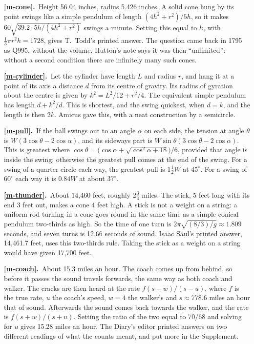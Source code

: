 \documentclass[11pt,a4paper]{article}
\newcommand{\ans}[2]{\par\smallskip\noindent\textbf{\ref{#1}.}\ #2}
\begin{document}
\ans{m-cone}{Height 56.04 inches, radius 5.426 inches. A solid cone hung by its point
swings like a simple pendulum of length $(4h^2 + r^2)/5h$, so it makes
$60\sqrt{39.2\cdot5h/(4h^2+r^2)}$ swings a minute. Setting this equal to $h$, with
$\tfrac13\pi r^2h = 1728$, gives T.~Todd's printed answer. The question came back in
1795 as Q995, without the volume. Hutton's note says it was then ``unlimited'': without
a second condition there are infinitely many such cones.}

\ans{m-cylinder}{Let the cylinder have length $L$ and radius $r$, and hang it at a point
of its axis a distance $d$ from its centre of gravity. Its radius of gyration about the
centre is given by $k^2 = L^2/12 + r^2/4$. The equivalent simple pendulum has length
$d + k^2/d$. This is shortest, and the swing quickest, when $d = k$, and the length is
then $2k$. Amicus gave this, with a neat construction by a semicircle.}

\ans{m-pull}{If the ball swings out to an angle $\alpha$ on each side, the tension at angle
$\theta$ is $W(3\cos\theta - 2\cos\alpha)$, and its sideways part is
$W\sin\theta(3\cos\theta - 2\cos\alpha)$. This is greatest where
$\cos\theta = \bigl(\cos\alpha + \sqrt{\cos^2\alpha + 18}\bigr)/6$, provided that angle is
inside the swing; otherwise the greatest pull comes at the end of the swing. For a swing
of a quarter circle each way, the greatest pull is $1\tfrac12W$ at $45^\circ$. For a swing
of $60^\circ$ each way it is $0.84W$ at about $37^\circ$.}

\ans{m-thunder}{About 14,460 feet, roughly $2\tfrac34$ miles. The stick, 5 feet long with
its end 3 feet out, makes a cone 4 feet high. A stick is not a weight on a string: a
uniform rod turning in a cone goes round in the same time as a simple conical pendulum
two-thirds as high. So the time of one turn is $2\pi\sqrt{(8/3)/g}\approx1.809$ seconds,
and seven turns is 12.66 seconds of sound. Isaac Saul's printed answer, 14,461.7 feet, uses
this two-thirds rule. Taking the stick as a weight on a string would have given
17,700 feet.}

\ans{m-coach}{About 15.3 miles an hour. The coach comes up from behind, so before it
passes the sound travels forwards, the same way as both coach and walker. The cracks are
then heard at the rate $f(s - w)/(s - u)$, where $f$ is the true rate, $u$ the coach's
speed, $w = 4$ the walker's and $s\approx778.6$ miles an hour that of sound. Afterwards the
sound comes back towards the walker, and the rate is $f(s + w)/(s + u)$. Setting the
ratio of the two equal to $70/68$ and solving for $u$ gives 15.28 miles an hour. The
Diary's editor printed answers on two different readings of what the counts meant, and
put more in the Supplement.}
\end{document}
